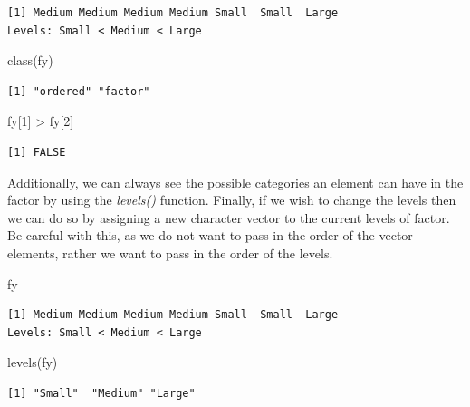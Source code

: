 \documentclass[
  letterpaper,
  DIV=11,
  numbers=noendperiod]{scrreprt}
\newenvironment{Shaded}{\begin{snugshade}}{\end{snugshade}}
\newcommand{\DecValTok}[1]{\textcolor[rgb]{0.68,0.00,0.00}{#1}}
\newcommand{\FunctionTok}[1]{\textcolor[rgb]{0.28,0.35,0.67}{#1}}
\newcommand{\NormalTok}[1]{\textcolor[rgb]{0.00,0.23,0.31}{#1}}
\newcommand{\SpecialCharTok}[1]{\textcolor[rgb]{0.37,0.37,0.37}{#1}}
\begin{document}
\begin{verbatim}
[1] Medium Medium Medium Medium Small  Small  Large 
Levels: Small < Medium < Large
\end{verbatim}

\begin{Shaded}
\begin{Highlighting}[]
\FunctionTok{class}\NormalTok{(fy)}
\end{Highlighting}
\end{Shaded}

\begin{verbatim}
[1] "ordered" "factor" 
\end{verbatim}

\begin{Shaded}
\begin{Highlighting}[]
\NormalTok{fy[}\DecValTok{1}\NormalTok{] }\SpecialCharTok{\textgreater{}}\NormalTok{ fy[}\DecValTok{2}\NormalTok{]}
\end{Highlighting}
\end{Shaded}

\begin{verbatim}
[1] FALSE
\end{verbatim}

Additionally, we can always see the possible categories an element can
have in the factor by using the \emph{levels()} function. Finally, if we
wish to change the levels then we can do so by assigning a new character
vector to the current levels of factor. Be careful with this, as we do
not want to pass in the order of the vector elements, rather we want to
pass in the order of the levels.

\begin{Shaded}
\begin{Highlighting}[]
\NormalTok{fy}
\end{Highlighting}
\end{Shaded}

\begin{verbatim}
[1] Medium Medium Medium Medium Small  Small  Large 
Levels: Small < Medium < Large
\end{verbatim}

\begin{Shaded}
\begin{Highlighting}[]
\FunctionTok{levels}\NormalTok{(fy)}
\end{Highlighting}
\end{Shaded}

\begin{verbatim}
[1] "Small"  "Medium" "Large" 
\end{verbatim}
\end{document}
